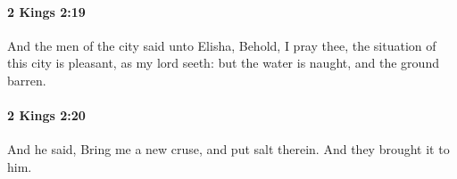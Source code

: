 		\paragraph{2 Kings 2:19} %
			\label{2KINGS-2-19}

			And the men of the city said unto Elisha, Behold, I pray thee, the situation of this city is pleasant, as my lord seeth: but the water is naught, and the ground barren.


		\paragraph{2 Kings 2:20} %
			\label{2KINGS-2-20}

			And he said, Bring me a new cruse, and put salt therein. And they brought it to him.


